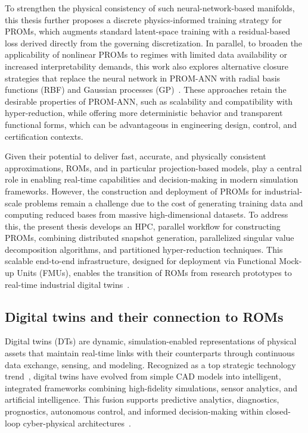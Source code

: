To strengthen the physical consistency of such neural-network-based manifolds, this thesis further proposes a discrete physics-informed training strategy for PROMs, which augments standard latent-space training with a residual-based loss derived directly from the governing discretization. In parallel, to broaden the applicability of nonlinear PROMs to regimes with limited data availability or increased interpretability demands, this work also explores alternative closure strategies that replace the neural network in PROM-ANN with radial basis functions (RBF) and Gaussian processes (GP)~\cite{de2025nonlinear}. These approaches retain the desirable properties of PROM-ANN, such as scalability and compatibility with hyper-reduction, while offering more deterministic behavior and transparent functional forms, which can be advantageous in engineering design, control, and certification contexts.

Given their potential to deliver fast, accurate, and physically consistent approximations, ROMs, and in particular projection-based models, play a central role in enabling real-time capabilities and decision-making in modern simulation frameworks. However, the construction and deployment of PROMs for industrial-scale problems remain a challenge due to the cost of generating training data and computing reduced bases from massive high-dimensional datasets. To address this, the present thesis develops an HPC, parallel workflow for constructing PROMs, combining distributed snapshot generation, parallelized singular value decomposition algorithms, and partitioned hyper-reduction techniques. This scalable end-to-end infrastructure, designed for deployment via Functional Mock-up Units (FMUs), enables the transition of ROMs from research prototypes to real-time industrial digital twins~\cite{Ares2024}.


\subsection{Digital twins and their connection to ROMs}

Digital twins (DTs) are dynamic, simulation-enabled representations of physical assets that maintain real-time links with their counterparts through continuous data exchange, sensing, and modeling. Recognized as a top strategic technology trend~\cite{panetta2018gartner}, digital twins have evolved from simple CAD models into intelligent, integrated frameworks combining high-fidelity simulations, sensor analytics, and artificial intelligence. This fusion supports predictive analytics, diagnostics, prognostics, autonomous control, and informed decision-making within closed-loop cyber-physical architectures~\cite{boschert2016digital, rosen2019next, grieves2014digital}.

